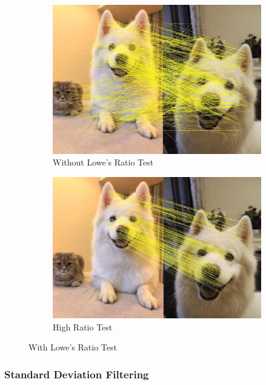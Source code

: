 \begin{figure}[H]
    \centering
    \begin{subfigure}[b]{0.36\textwidth}
        \includegraphics[width=\textwidth]{./Chapter 2/litfigs/lowes1.png}
        \caption{Without Lowe's Ratio Test}
        \label{fig:lowes1}
    \end{subfigure}
    \hfill
    \begin{subfigure}[b]{0.364\textwidth}
        \includegraphics[width=\textwidth]{./Chapter 2/litfigs/lowes2.png}
        \caption{High Ratio Test}
        \label{fig:lowes2}
    \end{subfigure}
    \caption{With Lowe's Ratio Test}
    \label{fig:lowes}
\end{figure}


\subsubsection{Standard Deviation Filtering}

